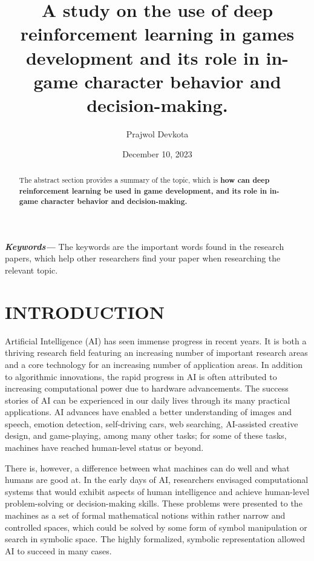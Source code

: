 \documentclass{article}
\title{A study on the use of deep reinforcement learning in games development and its role in in-game character behavior and decision-making.}
\author{Prajwol Devkota }
\date{December 10, 2023}
\providecommand{\keywords}[1] {
\small \textbf{\textit{Keywords---}} #1
}
\begin{document}
\maketitle
\begin{abstract}
The abstract section provides a summary of the topic, which is \textbf{how can deep reinforcement learning be used in game development, and its role in in-game character behavior and decision-making.} 
\end{abstract}

\keywords {The keywords are the important words found in the research papers, which help other researchers find your paper when researching the relevant topic.}

\newpage

\tableofcontents

\newpage

\section{INTRODUCTION}

Artificial Intelligence (AI) has seen immense progress in recent years. It is both a thriving research field featuring an increasing number of important research areas and a core technology for an increasing number of application areas. In addition to algorithmic innovations, the rapid progress in AI is often attributed to increasing computational power due to hardware advancements. The success stories of AI can be experienced in our daily lives through its many practical applications. AI advances have enabled a better understanding of images and speech, emotion detection, self-driving cars, web searching, AI-assisted creative design, and game-playing,
among many other tasks; for some of these tasks, machines have reached human-level status or beyond.

There is, however, a difference between what machines can do well and what humans are good at. In the early days of AI, researchers envisaged computational systems that would exhibit aspects of human intelligence and achieve human-level problem-solving or decision-making skills. These problems were presented to the machines as a set of formal mathematical notions within rather narrow and controlled spaces, which could be solved by some form of symbol manipulation or search in symbolic space. The highly formalized, symbolic representation allowed AI to succeed in many cases.
\end{document}
